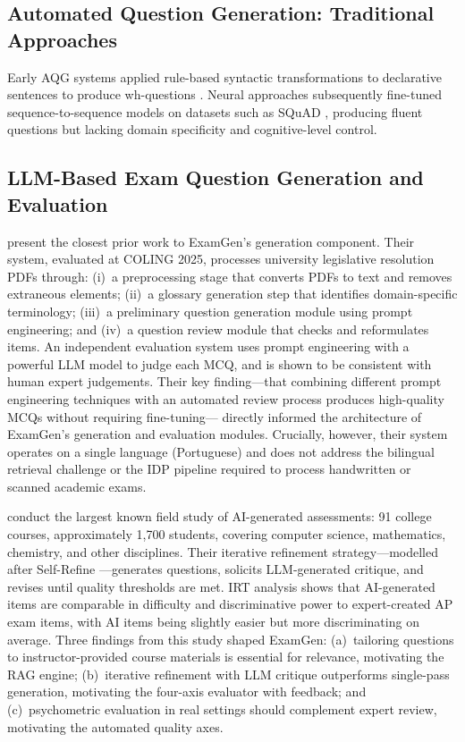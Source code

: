 \documentclass[12pt, a4paper]{article}
\begin{document}
\subsection{Automated Question Generation: Traditional Approaches}

Early AQG systems applied rule-based syntactic transformations to declarative
sentences to produce wh-questions \cite{heilman2010good}. Neural approaches
subsequently fine-tuned sequence-to-sequence models on datasets such as SQuAD
\cite{rajpurkar2016squad}, producing fluent questions but lacking domain
specificity and cognitive-level control.

\subsection{LLM-Based Exam Question Generation and Evaluation}

\citet{mucciaccia2025mcq} present the closest prior work to ExamGen's generation
component. Their system, evaluated at COLING 2025, processes university legislative
resolution PDFs through: (i)~a preprocessing stage that converts PDFs to text and
removes extraneous elements; (ii)~a glossary generation step that identifies
domain-specific terminology; (iii)~a preliminary question generation module using
prompt engineering; and (iv)~a question review module that checks and reformulates
items. An independent evaluation system uses prompt engineering with a powerful LLM
model to judge each MCQ, and is shown to be consistent with human expert judgements.
Their key finding---that combining different prompt engineering techniques with an
automated review process produces high-quality MCQs without requiring fine-tuning---
directly informed the architecture of ExamGen's generation and evaluation modules.
Crucially, however, their system operates on a single language (Portuguese) and
does not address the bilingual retrieval challenge or the IDP pipeline required to
process handwritten or scanned academic exams.

\citet{isley2025quality} conduct the largest known field study of AI-generated
assessments: 91 college courses, approximately 1,700 students, covering computer
science, mathematics, chemistry, and other disciplines. Their iterative refinement
strategy---modelled after Self-Refine \cite{madaan2023selfrefine}---generates
questions, solicits LLM-generated critique, and revises until quality thresholds are
met. IRT analysis shows that AI-generated items are comparable in difficulty and
discriminative power to expert-created AP exam items, with AI items being slightly
easier but more discriminating on average. Three findings from this study shaped ExamGen:
(a)~tailoring questions to instructor-provided course materials is essential for
relevance, motivating the RAG engine; (b)~iterative refinement with LLM critique
outperforms single-pass generation, motivating the four-axis evaluator with feedback;
and (c)~psychometric evaluation in real settings should complement expert review,
motivating the automated quality axes.
\end{document}
